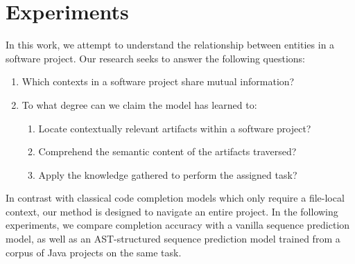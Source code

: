 \documentclass[11pt]{article}
\begin{document}
%

\section{Experiments}

In this work, we attempt to understand the relationship between entities in a software project. Our research seeks to answer the following questions:

\begin{enumerate}
  \item Which contexts in a software project share mutual information?
  \item To what degree can we claim the model has learned to:\begin{enumerate}
  \item Locate contextually relevant artifacts within a software project?
  \item Comprehend the semantic content of the artifacts traversed?
  \item Apply the knowledge gathered to perform the assigned task?
  \end{enumerate}
\end{enumerate}

In contrast with classical code completion models which only require a file-local context, our method is designed to navigate an entire project. In the following experiments, we compare completion accuracy with a vanilla sequence prediction model, as well as an AST-structured sequence prediction model trained from a corpus of Java projects on the same task.
\end{document}
